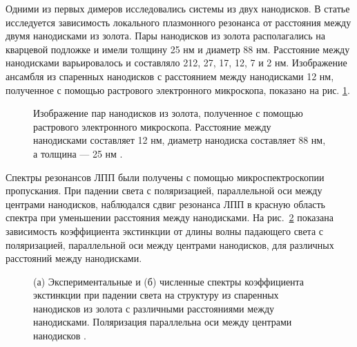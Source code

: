 Одними из первых димеров исследовались системы из двух нанодисков. В статье \cite{plasonrulereq} исследуется зависимость локального плазмонного резонанса от расстояния между двумя нанодисками из золота. Пары нанодисков из золота располагались на кварцевой подложке и имели толщину 25 нм и диаметр 88 нм. Расстояние между нанодисками варьировалось и составляло 212, 27, 17, 12, 7 и 2 нм. Изображение ансамбля из спаренных нанодисков с расстоянием между нанодисками 12 нм, полученное с помощью растрового электронного микроскопа, показано на рис. \ref{img:PR_SEM}.
\begin{figure}
\caption{Изображение пар нанодисков из золота, полученное с помощью растрового электронного микроскопа. Расстояние между нанодисками составляет 12 нм, диаметр нанодиска составляет 88 нм, а толщина --- 25 нм \cite{plasonrulereq}.}
\label{img:PR_SEM}
\end{figure}
Спектры резонансов ЛПП были получены с помощью микроспектроскопии пропускания. При падении света с поляризацией, параллельной оси между центрами нанодисков, наблюдался сдвиг резонанса ЛПП в красную область спектра при уменьшении расстояния между нанодисками. На рис.~\ref{img:PR_extinction} показана зависимость коэффициента экстинкции от длины волны падающего света с поляризацией, параллельной оси между центрами нанодисков, для различных расстояний между нанодисками.
\begin{figure}[t]
\caption{(а) Экспериментальные и (б) численные спектры коэффициента экстинкции при падении света на структуру из спаренных нанодисков из золота с различными расстояниями между нанодисками. Поляризация параллельна оси между центрами нанодисков \cite{plasonrulereq}.}
\label{img:PR_extinction}
\end{figure}
